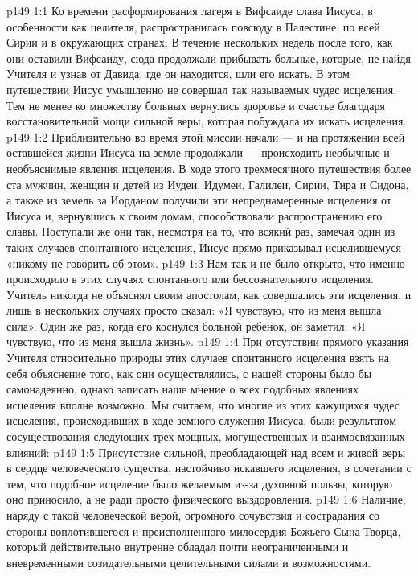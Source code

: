 \vs p149 1:1 Ко времени расформирования лагеря в Вифсаиде слава Иисуса, в особенности как целителя, распространилась повсюду в Палестине, по всей Сирии и в окружающих странах. В течение нескольких недель после того, как они оставили Вифсаиду, сюда продолжали прибывать больные, которые, не найдя Учителя и узнав от Давида, где он находится, шли его искать. В этом путешествии Иисус умышленно не совершал так называемых чудес исцеления. Тем не менее ко множеству больных вернулись здоровье и счастье благодаря восстановительной мощи сильной веры, которая побуждала их искать исцеления.
\vs p149 1:2 Приблизительно во время этой миссии начали --- и на протяжении всей оставшейся жизни Иисуса на земле продолжали --- происходить необычные и необъяснимые явления исцеления. В ходе этого трехмесячного путешествия более ста мужчин, женщин и детей из Иудеи, Идумеи, Галилеи, Сирии, Тира и Сидона, а также из земель за Иорданом получили эти непреднамеренные исцеления от Иисуса и, вернувшись к своим домам, способствовали распространению его славы. Поступали же они так, несмотря на то, что всякий раз, замечая один из таких случаев спонтанного исцеления, Иисус прямо приказывал исцелившемуся «никому не говорить об этом».
\vs p149 1:3 \pc Нам так и не было открыто, что именно происходило в этих случаях спонтанного или бессознательного исцеления. Учитель никогда не объяснял своим апостолам, как совершались эти исцеления, и лишь в нескольких случаях просто сказал: «Я чувствую, что из меня вышла сила». Один же раз, когда его коснулся больной ребенок, он заметил: «Я чувствую, что из меня вышла жизнь».
\vs p149 1:4 При отсутствии прямого указания Учителя относительно природы этих случаев спонтанного исцеления взять на себя объяснение того, как они осуществлялись, с нашей стороны было бы самонадеянно, однако записать наше мнение о всех подобных явлениях исцеления вполне возможно. Мы считаем, что многие из этих кажущихся чудес исцеления, происходивших в ходе земного служения Иисуса, были результатом сосуществования следующих трех мощных, могущественных и взаимосвязанных влияний:
\vs p149 1:5 \bibnobreakspace Присутствие сильной, преобладающей над всем и живой веры в сердце человеческого существа, настойчиво искавшего исцеления, в сочетании с тем, что подобное исцеление было желаемым из\hyp{}за духовной пользы, которую оно приносило, а не ради просто физического выздоровления.
\vs p149 1:6 \bibnobreakspace Наличие, наряду с такой человеческой верой, огромного сочувствия и сострадания со стороны воплотившегося и преисполненного милосердия Божьего Сына\hyp{}Творца, который действительно внутренне обладал почти неограниченными и вневременными созидательными целительными силами и возможностями.
